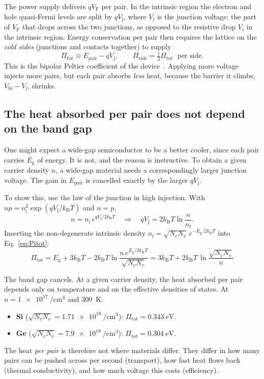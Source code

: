 \documentclass[11pt,a4paper]{article}
\newcommand{\kB}{k_{\mathrm{B}}}
\newcommand{\Eg}{E_{\mathrm{g}}}
\newcommand{\Ep}{E_{\mathrm{pair}}}
\newcommand{\Vj}{V_{\mathrm{j}}}
\newcommand{\VF}{V_{\mathrm{F}}}
\newcommand{\Pis}{\Pi_{\mathrm{side}}}
\newcommand{\Pit}{\Pi_{\mathrm{tot}}}
\newcommand{\nI}{n_{\mathrm{i}}}
\begin{document}
The power supply delivers $q\VF$ per pair. In the intrinsic region the electron and hole quasi-Fermi levels are split by $q\Vj$, where $\Vj$ is the junction voltage: the part of $\VF$ that drops across the two junctions, as opposed to the resistive drop $V_i$ in the intrinsic region. Energy conservation per pair then requires the lattice on the \emph{cold sides} (junctions and contacts together) to supply
\begin{equation}
  \Pit \equiv \Ep - q\Vj , \qquad \Pis = \tfrac12\Pit \;\text{ per side.} \label{eq:Pitot}
\end{equation}
This is the bipolar Peltier coefficient of the device~\cite{pipe2002}. Applying more voltage injects more pairs, but each pair absorbs \emph{less} heat, because the barrier it climbs, $V_{\mathrm{bi}}-\Vj$, shrinks.

\subsection{The heat absorbed per pair does not depend on the band gap}
One might expect a wide-gap semiconductor to be a better cooler, since each pair carries $\Eg$ of energy. It is not, and the reason is instructive. To obtain a given carrier density $n$, a wide-gap material needs a correspondingly larger junction voltage. The gain in $\Ep$ is cancelled exactly by the larger $q\Vj$.

To show this, use the law of the junction in high injection. With $np=\nI^2\exp(q\Vj/\kB T)$ and $n=p$,
\begin{equation}
  n = \nI\, e^{q\Vj/2\kB T}
  \quad\Longrightarrow\quad
  q\Vj = 2\kB T\ln\frac{n}{\nI}. \label{eq:junction}
\end{equation}
Inserting the non-degenerate intrinsic density $\nI=\sqrt{N_cN_v}\,e^{-\Eg/2\kB T}$ into Eq.~\eqref{eq:Pitot}:
\begin{equation}
\boxed{\;
  \Pit = \Eg + 3\kB T - 2\kB T\ln\frac{n\,e^{\Eg/2\kB T}}{\sqrt{N_cN_v}}
       = 3\kB T + 2\kB T\,\ln\frac{\sqrt{N_c N_v}}{n}\; } \label{eq:Pi_universal}
\end{equation}

\begin{keyresult}
The band gap cancels. At a given carrier density, the heat absorbed per pair depends only on temperature and on the effective densities of states. At $n=\SI{1e17}{\per\centi\metre\cubed}$ and \SI{300}{\kelvin}:
\begin{itemize}
  \item \textbf{Si} ($\sqrt{N_cN_v}=\SI{1.71e19}{\per\centi\metre\cubed}$): $\Pit=\SI{0.343}{\electronvolt}$.
  \item \textbf{Ge} ($\sqrt{N_cN_v}=\SI{7.9e18}{\per\centi\metre\cubed}$): $\Pit=\SI{0.304}{\electronvolt}$.
\end{itemize}
The heat \emph{per pair} is therefore not where materials differ. They differ in how many pairs can be pushed across per second (transport), how fast heat flows back (thermal conductivity), and how much voltage this costs (efficiency).
\end{keyresult}
\end{document}
